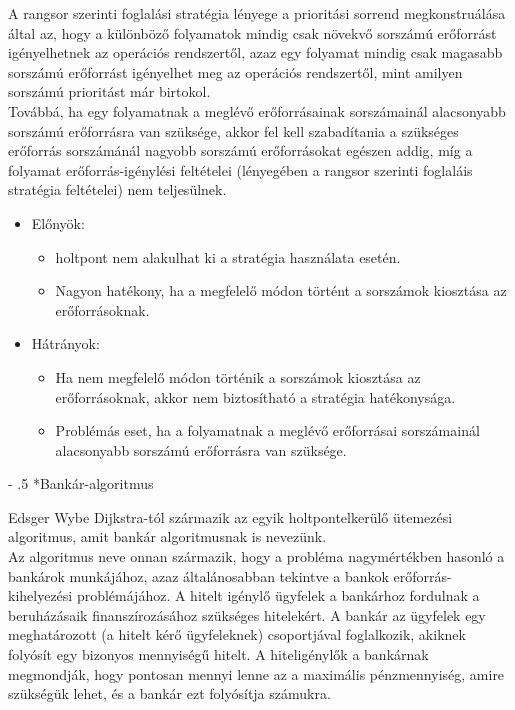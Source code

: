 \documentclass[tikz,12pt,margin=0px]{article}
\makeatletter
\renewcommand\paragraph{%
	\@startsection{paragraph}{4}{0mm}%
	{-\baselineskip}%
	{.5\baselineskip}%
	{\normalfont\normalsize\bfseries}}
\makeatother
\begin{document}
    \noindent A rangsor szerinti foglalási stratégia lényege a prioritási sorrend megkonstruálása által az, hogy a különböző folyamatok mindig csak növekvő sorszámú erőforrást igényelhetnek az operációs rendszertől, azaz egy folyamat mindig csak magasabb sorszámú erőforrást igényelhet meg az operációs rendszertől, mint amilyen sorszámú prioritást már birtokol.\\

    \noindent Továbbá, ha egy folyamatnak a meglévő erőforrásainak sorszámainál alacsonyabb sorszámú erőforrásra van szüksége, akkor fel kell szabadítania a szükséges erőforrás sorszámánál nagyobb sorszámú erőforrásokat egészen addig, míg a folyamat erőforrás-igénylési feltételei (lényegében a rangsor szerinti foglaláis stratégia feltételei) nem teljesülnek.

    \begin{itemize}[topsep=8pt,itemsep=4pt,partopsep=4pt, parsep=4pt]
        \item Előnyök:
        \begin{itemize}
            \item holtpont nem alakulhat ki a stratégia használata esetén.
            \item Nagyon hatékony, ha a megfelelő módon történt a sorszámok kiosztása az erőforrásoknak.
        \end{itemize}
        \item Hátrányok:
        \begin{itemize}
            \item Ha nem megfelelő módon történik a sorszámok kiosztása az erőforrásoknak, akkor nem biztosítható a stratégia hatékonysága.
            \item Problémás eset, ha a folyamatnak a meglévő erőforrásai sorszámainál alacsonyabb sorszámú erőforrásra van szüksége.
        \end{itemize}
    \end{itemize}

    \paragraph*{Bankár-algoritmus}

    Edsger Wybe Dijkstra-tól származik az egyik holtpontelkerülő ütemezési algoritmus, amit bankár algoritmusnak is nevezünk.\\

    \noindent Az algoritmus neve onnan származik, hogy a probléma nagymértékben hasonló a bankárok munkájához, azaz általánosabban tekintve a bankok erőforrás-kihelyezési problémájához. A hitelt igénylő ügyfelek a bankárhoz fordulnak a beruházásaik finanszírozásához szükséges hitelekért. A bankár az ügyfelek egy meghatározott (a hitelt kérő ügyfeleknek) csoportjával foglalkozik, akiknek folyósít egy bizonyos mennyiségű hitelt. A hiteligénylők a bankárnak megmondják, hogy pontosan mennyi lenne az a maximális pénzmennyiség, amire szükségük lehet, és a bankár ezt folyósítja számukra.\\
\end{document}
